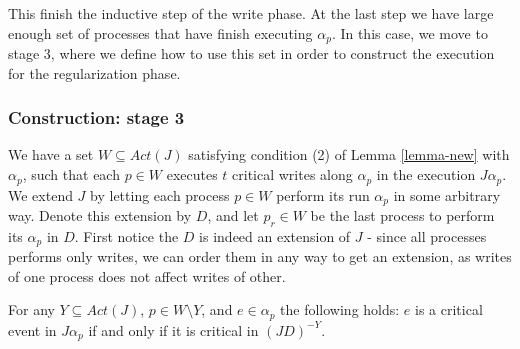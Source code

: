 This finish the inductive step of the write phase. At the last step we have large enough set of processes that have finish executing $\alpha_p$. In this case, we move to stage 3, where we define how to use this set in order to construct the execution for the regularization phase.



\subsubsection{Construction: stage 3}

We have a set $W \subseteq Act(J)$ satisfying condition (2) of Lemma \ref{lemma-new} with $\alpha_p$, such that each $p \in W$ executes $t$ critical writes along $\alpha_p$ in the execution $J \alpha_p$.
We extend $J$ by letting each process $p \in W$ perform its run $\alpha_p$ in some arbitrary way. Denote this extension by $D$, and let $p_r \in W$ be the last process to perform its $\alpha_p$ in $D$. First notice the $D$ is indeed an extension of $J$ - since all processes performs only writes, we can order them in any way to get an extension, as writes of one process does not affect writes of other.

\begin{claim-subsection} \label{claim:IN3-write-phase}
	For any $Y \subseteq Act(J)$, $p \in W \setminus Y$, and $e \in \alpha_p$ the following holds:
	$e$ is a critical event in $J \alpha_p$ if and only if it is critical in $(J D)^{-Y}$.
\end{claim-subsection}

